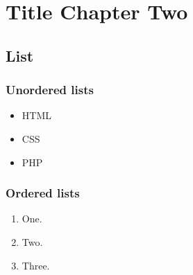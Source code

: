 \chapter{Title Chapter Two}

\section{List}
\subsection{Unordered lists}
\begin{itemize}
  \item HTML
  \item CSS
  \item PHP
\end{itemize}

\subsection{Ordered lists}
\begin{enumerate}
  \item One.
  \item Two.
  \item Three.
\end{enumerate}